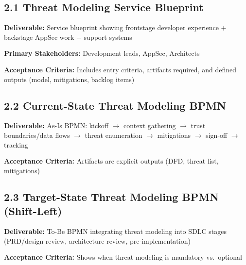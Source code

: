 \documentclass[11pt,letterpaper]{article}
\newcommand{\storyfield}[2]{\textbf{#1:} #2}
\begin{document}
\subsection{2.1 Threat Modeling Service Blueprint}

\begin{storycard}
\storyfield{Deliverable}{Service blueprint showing frontstage developer experience + backstage AppSec work + support systems}

\storyfield{Primary Stakeholders}{Development leads, AppSec, Architects}

\storyfield{Acceptance Criteria}{Includes entry criteria, artifacts required, and defined outputs (model, mitigations, backlog items)}
\end{storycard}

\subsection{2.2 Current-State Threat Modeling BPMN}

\begin{storycard}
\storyfield{Deliverable}{As-Is BPMN: kickoff $\rightarrow$ context gathering $\rightarrow$ trust boundaries/data flows $\rightarrow$ threat enumeration $\rightarrow$ mitigations $\rightarrow$ sign-off $\rightarrow$ tracking}

\storyfield{Acceptance Criteria}{Artifacts are explicit outputs (DFD, threat list, mitigations)}
\end{storycard}

\subsection{2.3 Target-State Threat Modeling BPMN (Shift-Left)}

\begin{storycard}
\storyfield{Deliverable}{To-Be BPMN integrating threat modeling into SDLC stages (PRD/design review, architecture review, pre-implementation)}

\storyfield{Acceptance Criteria}{Shows when threat modeling is mandatory vs.\ optional}
\end{storycard}

\end{document}
